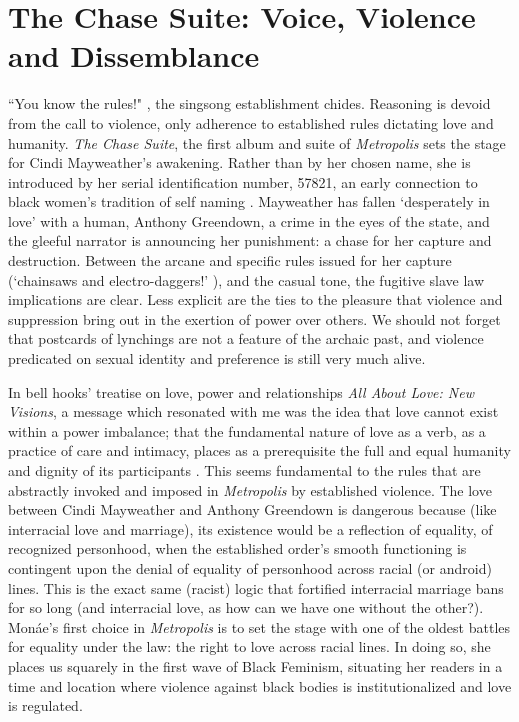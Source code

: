 \documentclass[a4paper, 11pt]{article} %
\begin{document}

\section*{The Chase Suite: Voice, Violence and Dissemblance}

``You know the rules!" \cite{wolfmasters}, the singsong establishment chides.
Reasoning is devoid from the call to violence, only adherence to established rules dictating love and humanity.
\emph{The Chase Suite}, the first album and suite of \emph{Metropolis} sets the stage for Cindi Mayweather's awakening.
Rather than by her chosen name, she is introduced by her serial identification number, 57821, an early connection to black women's tradition of self naming \cite{selfnaming}.
Mayweather has fallen `desperately in love' with a human, Anthony Greendown, a crime in the eyes of the state, and the gleeful narrator is announcing her punishment: a chase for her capture and destruction.
Between the arcane and specific rules issued for her capture (`chainsaws and electro-daggers!' \cite{wolfmasters}), and the casual tone, the fugitive slave law implications are clear.
Less explicit are the ties to the pleasure that violence and suppression bring out in the exertion of power over others.
We should not forget that postcards of lynchings are not a feature of the archaic past, and violence predicated on sexual identity and preference is still very much alive.

In bell hooks' treatise on love, power and relationships \emph{All About Love: New Visions}, a message which resonated with me was the idea that love cannot exist within a power imbalance; that the fundamental nature of love as a verb, as a practice of care and intimacy, places as a prerequisite the full and equal humanity and dignity of its participants \cite{newvisions}. 
This seems fundamental to the rules that are abstractly invoked and imposed in \emph{Metropolis} by established violence. 
The love between Cindi Mayweather  and Anthony Greendown is dangerous because (like interracial love and marriage), its existence would be a reflection of equality, of recognized personhood, when the established order's smooth functioning is contingent upon the denial of equality of personhood across racial (or android) lines. 
This is the exact same (racist) logic that fortified interracial marriage bans for so long (and interracial love, as how can we have one without the other?).
Mon\'ae's first choice in \emph{Metropolis} is to set the stage with one of the oldest battles for equality under the law: the right to love across racial lines.
In doing so, she places us squarely in the first wave of Black Feminism, situating her readers in a time and location where violence against black bodies is institutionalized and love is regulated.
\end{document}
